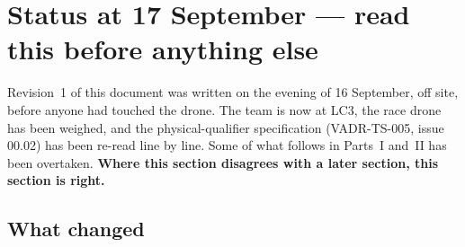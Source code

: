 \section*{Status at 17 September --- read this before anything else}

Revision~1 of this document was written on the evening of 16 September, off site, before anyone had
touched the drone. The team is now at LC3, the race drone has been weighed, and the physical-qualifier
specification (VADR-TS-005, issue 00.02) has been re-read line by line. Some of what follows in
Parts~I and~II has been overtaken. \textbf{Where this section disagrees with a later section, this
section is right.}

\subsection*{What changed}

